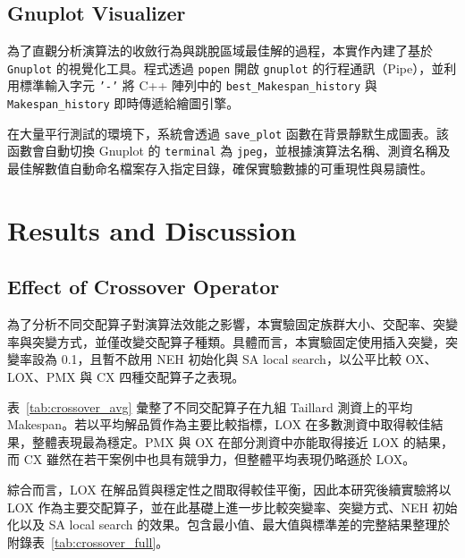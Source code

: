 \documentclass[conference]{IEEEtran}
\begin{document}
\subsection{Gnuplot Visualizer}
為了直觀分析演算法的收斂行為與跳脫區域最佳解的過程，本實作內建了基於 \texttt{Gnuplot} 的視覺化工具。程式透過 \texttt{popen} 開啟 \texttt{gnuplot} 的行程通訊（Pipe），並利用標準輸入字元 \texttt{'-'} 將 C++ 陣列中的 \texttt{best\_Makespan\_history} 與 \texttt{Makespan\_history} 即時傳遞給繪圖引擎。

在大量平行測試的環境下，系統會透過 \texttt{save\_plot} 函數在背景靜默生成圖表。該函數會自動切換 Gnuplot 的 \texttt{terminal} 為 \texttt{jpeg}，並根據演算法名稱、測資名稱及最佳解數值自動命名檔案存入指定目錄，確保實驗數據的可重現性與易讀性。

\section{Results and Discussion}
\subsection{Effect of Crossover Operator}
為了分析不同交配算子對演算法效能之影響，本實驗固定族群大小、交配率、突變率與突變方式，並僅改變交配算子種類。具體而言，本實驗固定使用插入突變，突變率設為 0.1，且暫不啟用 NEH 初始化與 SA local search，以公平比較 OX、LOX、PMX 與 CX 四種交配算子之表現。

表~\ref{tab:crossover_avg} 彙整了不同交配算子在九組 Taillard 測資上的平均 Makespan。若以平均解品質作為主要比較指標，LOX 在多數測資中取得較佳結果，整體表現最為穩定。PMX 與 OX 在部分測資中亦能取得接近 LOX 的結果，而 CX 雖然在若干案例中也具有競爭力，但整體平均表現仍略遜於 LOX。

綜合而言，LOX 在解品質與穩定性之間取得較佳平衡，因此本研究後續實驗將以 LOX 作為主要交配算子，並在此基礎上進一步比較突變率、突變方式、NEH 初始化以及 SA local search 的效果。包含最小值、最大值與標準差的完整結果整理於附錄表~\ref{tab:crossover_full}。
\end{document}
